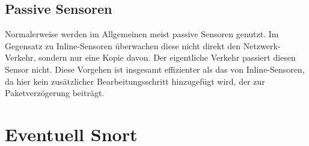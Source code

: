 \subsection{Passive Sensoren}
Normalerweise werden im Allgemeinen meist passive Sensoren genutzt. Im Gegensatz zu Inline-Sensoren überwachen diese nicht direkt den Netzwerk-Verkehr, sondern nur eine Kopie davon. Der eigentliche Verkehr passiert diesen Sensor nicht. Diese Vorgehen ist insgesamt effizienter als das von Inline-Sensoren, da hier kein zusätzlicher Bearbeitungsschritt hinzugefügt wird, der zur Paketverzögerung beiträgt.\cite{url_sensors}


\section{Eventuell Snort}